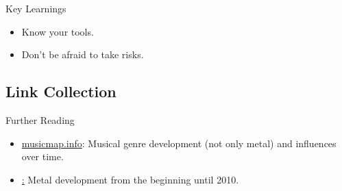\documentclass{beamer}
\begin{document}
    \begin{frame}{Key Learnings}
    
      \begin{itemize}
        \item<1-> Know your tools.
        \item<1-> Don't be afraid to take risks.
      \end{itemize}
      
    \end{frame}
    
  \subsection{Link Collection}

    \begin{frame}{Further Reading}
      \begin{itemize}
        \item\href{https://musicmap.info/}{musicmap.info}: Musical genre development (not only metal) and influences over time.
        \item\href{https://www.boundbymetal.com/en/common/metal-genres-graph/}: Metal development from the beginning until 2010.
      \end{itemize}
    \end{frame}
\end{document}
